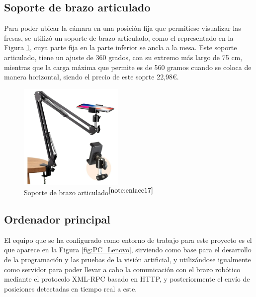\setcounter{footnote}{16}

\subsection{Soporte de brazo articulado}
\label{subsec:soporte_camara}

Para poder ubicar la cámara en una posición fija que permitiese visualizar las fresas, se utilizó un soporte de brazo articulado, como el representado en la Figura \ref{fig:soporte_camara}, cuya parte fija en la parte inferior se ancla a la mesa. Este soporte articulado, tiene un ajuste de 360 grados, con su extremo más largo de 75 cm, mientras que la carga máxima que permite es de 560 gramos cuando se coloca de manera horizontal, siendo el precio de este soprte 22,98€.

\begin{figure} [H]
    \begin{center}
      \includegraphics[width=5cm]{figs/Soporte de brazo articulado.jpeg}
    \end{center}
    \caption{Soporte de brazo articulado$^{\ref{note:enlace17}}$}
    \label{fig:soporte_camara}
\end{figure}
 
\setcounter{footnote}{17} 

\subsection{Ordenador principal}
\label{subsec:ordenador}

El equipo que se ha configurado como entorno de trabajo para este proyecto es el que aparece en la Figura \ref{fig:PC_Lenovo}, sirviendo como base para el desarrollo de la programación y las pruebas de la visión artificial, y utilizándose igualmente como servidor para poder llevar a cabo la comunicación con el brazo robótico mediante el protocolo XML-RPC basado en HTTP, y posteriormente el envío de posiciones detectadas en tiempo real a este. 

